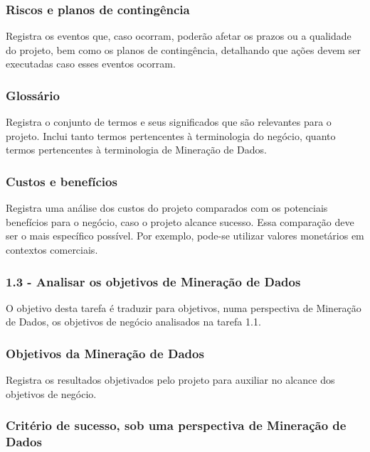 \subsubsection*{Riscos e planos de contingência}

Registra os eventos que, caso ocorram, poderão afetar os prazos ou a qualidade do projeto, bem como os planos de contingência, detalhando que ações devem ser executadas caso esses eventos ocorram.

\subsubsection*{Glossário}

Registra o conjunto de termos e seus significados que são relevantes para o projeto. Inclui tanto termos pertencentes à terminologia do negócio, quanto termos pertencentes à terminologia de Mineração de Dados.

\subsubsection*{Custos e benefícios}

Registra uma análise dos custos do projeto comparados com os potenciais benefícios para o negócio, caso o projeto alcance sucesso. Essa comparação deve ser o mais específico possível. Por exemplo, pode-se utilizar valores monetários em contextos comerciais.

\subsubsection*{\textbf{1.3 - Analisar os objetivos de Mineração de Dados}}

O objetivo desta tarefa é traduzir para objetivos, numa perspectiva de Mineração de Dados, os objetivos de negócio analisados na tarefa 1.1.

\subsubsection*{Objetivos da Mineração de Dados}

Registra os resultados objetivados pelo projeto para auxiliar no alcance dos objetivos de negócio.

\subsubsection*{Critério de sucesso, sob uma perspectiva de Mineração de Dados}

